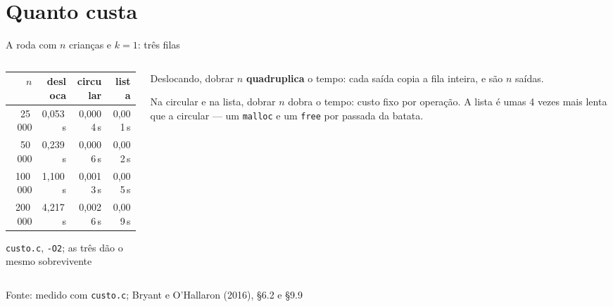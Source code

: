 \documentclass[aspectratio=169]{beamer}
\newcommand{\fonte}[1]{\vfill\hfill{\scriptsize\textcolor{UFSGray}{Fonte: #1}}}
\begin{document}
\section{Quanto custa}

\begin{frame}{A roda com $n$ crianças e $k = 1$: três filas}
  \begin{columns}[c]
    \begin{column}{0.54\textwidth}
      \begin{center}
      \small
      \begin{tabular}{@{}rrrr@{}}
        \toprule
        $n$ & desloca & circular & lista\\
        \midrule
        25\,000  & 0,053\,s & 0,0004\,s & 0,001\,s\\
        50\,000  & 0,239\,s & 0,0006\,s & 0,002\,s\\
        100\,000 & 1,100\,s & 0,0013\,s & 0,005\,s\\
        200\,000 & 4,217\,s & 0,0026\,s & 0,009\,s\\
        \bottomrule
      \end{tabular}

      \medskip
      \scriptsize \texttt{custo.c}, \texttt{-O2}; as três dão o mesmo
      sobrevivente
      \end{center}
    \end{column}
    \begin{column}{0.42\textwidth}
      \small
      Deslocando, dobrar $n$ \textbf{quadruplica} o tempo: cada saída copia
      a fila inteira, e são $n$ saídas.

      \medskip
      Na circular e na lista, dobrar $n$ dobra o tempo: custo fixo por
      operação. A lista é umas 4 vezes mais lenta que a circular --- um
      \texttt{malloc} e um \texttt{free} por passada da batata.
    \end{column}
  \end{columns}
  \fonte{medido com \texttt{custo.c};
    Bryant e O'Hallaron (2016), §6.2 e §9.9~\cite{bryant2016computer}}
\end{frame}
\end{document}
